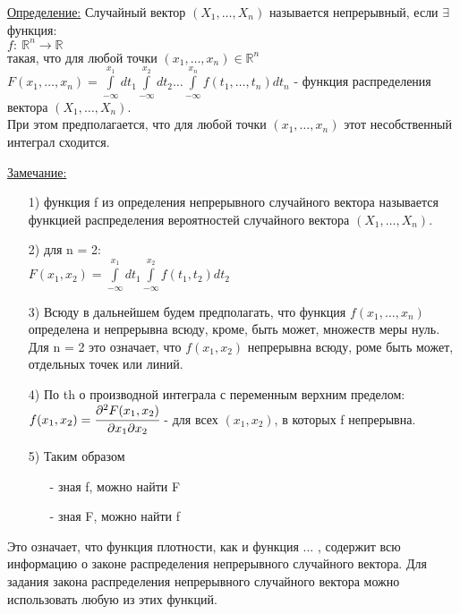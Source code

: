 
\underline{Определение:} Случайный вектор $(X_1, \ldots, X_n)$ называется непрерывный, если $\exists$ функция: \\
$f: \ \mathbb{R}^n \to \mathbb{R}$ \\
такая, что для любой точки $(x_1, \ldots, x_n) \in \mathbb{R}^n$ \\
$\displaystyle  F(x_1, \ldots, x_n) = \int\limits_{-\infty}^{x_1} d t_1 \int\limits_{-\infty}^{x_2} dt_2 \ldots \int\limits_{-\infty}^{x_n} f(t_1, \ldots, t_n) dt_n$ - функция распределения вектора $(X_1, \ldots, X_n)$. \\
При этом предполагается, что для любой точки $(x_1, \ldots, x_n)$ этот несобственный интеграл сходится.

\underline{Замечание:} 
\begin{enumerate}
\item[1)] функция f из определения непрерывного случайного вектора называется функцией распределения вероятностей случайного вектора $(X_1, \ldots, X_n)$. 

\item[2)] для n = 2: \\
$\displaystyle F(x_1, x_2) = \int\limits_{-\infty}^{x_1} dt_1 \int\limits_{-\infty}^{x_2} f(t_1, t_2) dt_2$

\item[3)] Всюду в дальнейшем будем предполагать, что функция $f(x_1, \ldots, x_n)$ определена и непрерывна всюду, кроме, быть может, множеств меры нуль. \\
Для n = 2 это означает, что $f(x_1, x_2)$ непрерывна всюду, роме быть может, отдельных точек или линий.

\item[4)] По th о производной интеграла с переменным верхним пределом: \\
$f(x_1, x_2) = \cfrac{\partial^2 F(x_1, x_2)}{\partial x_1 \partial x_2}$ - для всех $(x_1, x_2)$, в которых f непрерывна.

\item[5)] Таким образом \\
	\begin{enumerate}
	\item[-] зная f, можно найти F
	\item[-] зная F, можно найти f
	\end{enumerate}
\end{enumerate}


Это означает, что функция плотности, как и функция ... , содержит всю информацию о законе распределения непрерывного случайного вектора. Для задания закона распределения непрерывного случайного вектора можно использовать любую из этих функций. %


